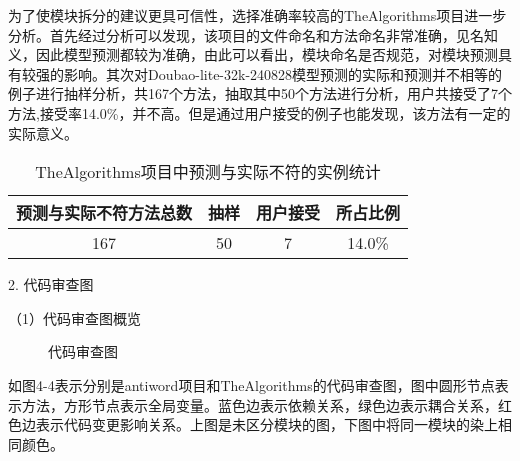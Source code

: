 为了使模块拆分的建议更具可信性，选择准确率较高的TheAlgorithms项目进一步分析。首先经过分析可以发现，该项目的文件命名和方法命名非常准确，见名知义，因此模型预测都较为准确，由此可以看出，模块命名是否规范，对模块预测具有较强的影响。其次对Doubao-lite-32k-240828模型预测的实际和预测并不相等的例子进行抽样分析，共167个方法，抽取其中50个方法进行分析，用户共接受了7个方法,接受率14.0\%，并不高。但是通过用户接受的例子也能发现，该方法有一定的实际意义。

\begin{table}[htbp]
\caption{TheAlgorithms项目中预测与实际不符的实例统计}
\vspace{0.5em}\centering\wuhao
\begin{tabular}{cccc}
\toprule
预测与实际不符方法总数 & 抽样 & 用户接受 & 所占比例 \\
\midrule
167 & 50 & 7 & 14.0\% \\
\bottomrule
\end{tabular}
\end{table}


2. 代码审查图

（1）代码审查图概览

\begin{figure}[!h]
    \setlength{\subfigcapskip}{-1bp}
    \centering
    \begin{minipage}{\textwidth}
    \centering
    \hspace{2em}
    \end{minipage}
    \centering
    \begin{minipage}{\textwidth}
    \centering
    \hspace{2em}
    \end{minipage}
    \vspace{0.2em}
    \caption{代码审查图} %
\end{figure}

如图4-4表示分别是antiword项目和TheAlgorithms的代码审查图，图中圆形节点表示方法，方形节点表示全局变量。蓝色边表示依赖关系，绿色边表示耦合关系，红色边表示代码变更影响关系。上图是未区分模块的图，下图中将同一模块的染上相同颜色。





